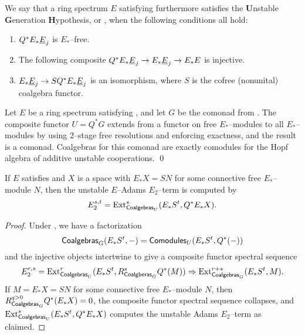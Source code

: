 \begin{definition}
We say that a ring spectrum $E$ satisfying {\UFH} furthermore satisfies the \textbf{U}nstable \textbf{G}eneration \textbf{H}ypothesis, or {\UGH}, when the following conditions all hold:
\begin{enumerate}
    \item $Q^* E_* \underline{\smash{E}}_{j}$ is $E_*$--free.
    \item The following composite $Q^* E_* \underline{\smash{E}}_{j} \to E_* \underline{\smash{E}}_{j} \to E_* E$ is injective.
    \item $E_* \underline{\smash{E}}_{j} \to SQ^*E_* \underline{\smash{E}}_{j}$ is an isomorphism, where $S$ is the cofree (nonunital) coalgebra functor.
\end{enumerate}
\end{definition}

\begin{lemma}
Let $E$ be a ring spectrum satisfying {\UGH}, and let $G$ be the comonad from .  The composite functor $U = Q^* G$ extends from a functor on free $E_*$--modules to all $E_*$--modules by using $2$--stage free resolutions and enforcing exactness, and the result is a comonad.  Coalgebras for this comonad are exactly comodules for the Hopf algebra of additive unstable cooperations. \qed
\end{lemma}

\begin{corollary}
If $E$ satisfies {\UGH} and $X$ is a space with $E_* X = SN$ for some connective free $E_*$--module $N$, then the unstable $E$--Adams $E_2$--term is computed by \[E_2^{s, t} = \operatorname{Ext}^s_{\mathsf{Coalgebras}_U}(E_* S^t, Q^* E_* X).\]
\end{corollary}
\begin{proof}
Under {\UGH}, we have a factorization \[\mathsf{Coalgebras}_{G}(E_* S^t, -) = \mathsf{Comodules}_{U}(E_* S^t, Q^*(-))\] and the injective objects intertwine to give a composite functor spectral sequence \[E_2^{r, s} = \operatorname{Ext}^r_{\mathsf{Coalgebras}_U}(E_* S^t, R^s_{\mathsf{Coalgberas}_G} Q^*(M)) \Rightarrow \operatorname{Ext}^{r+s}_{\mathsf{Coalgebras}_G}(E_* S^t, M).\]  If $M = E_* X = SN$ for some connective free $E_*$--module $N$, then $R^{q > 0}_{\mathsf{Coalgebras}_G} Q^*(E_* X) = 0$, the composite functor spectral sequence collapses, and $\operatorname{Ext}^s_{\mathsf{Coalgebras}_U}(E_* S^t, Q^* E_* X)$ computes the unstable Adams $E_2$--term as claimed.
\end{proof}

